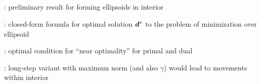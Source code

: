 \subsection*{}
\item {}: preliminary result for forming ellipsoids in interior
\item {}: closed-form formula for optimal
solution \(\bm{d}^{*}\) to the problem of minimization over ellipsoid
\item {}: optimal condition for ``near
optimality'' for primal and dual
\item {}: long-step variant with maximum
norm (and also \(\gamma\)) would lead to movements within interior
